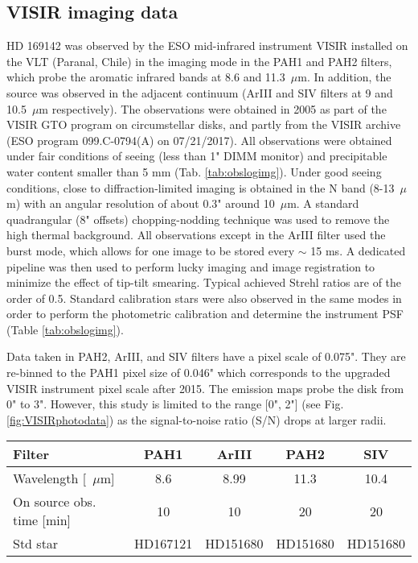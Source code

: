 \documentclass{aa}
\newcommand{\mic}{~$\mu$m\xspace}
\begin{document}
\subsection{VISIR imaging data} \label{sec:photometryVISIR} 
HD 169142 was observed by the ESO mid-infrared instrument VISIR installed on the VLT (Paranal, Chile) in the imaging mode in the PAH1 and PAH2 filters, which probe the aromatic infrared bands at 8.6 and 11.3\mic. In addition, the source was observed in the adjacent continuum (ArIII and SIV filters at 9 and 10.5\mic respectively).
The observations were obtained in 2005 as part of the VISIR GTO program on circumstellar disks, and partly from the VISIR archive (ESO program 099.C-0794(A) on 07/21/2017). All observations were obtained under fair conditions of seeing (less than 1" DIMM monitor) and precipitable water content smaller than 5 mm (Tab. \ref{tab:obslogimg}). Under good seeing conditions, close to diffraction-limited imaging is obtained in the N band (8-13\mic) with an angular resolution of about 0.3" around 10\mic. A standard quadrangular (8" offsets) chopping-nodding technique was used to remove the high thermal background.
All observations except in the ArIII filter used the burst mode, which allows for one image to be stored every $\sim$ 15 ms. A dedicated pipeline was then used to perform lucky imaging \citep{Law2006} and image registration to minimize the effect of tip-tilt smearing. Typical achieved Strehl ratios are of the order of 0.5. Standard calibration stars were also observed in the same modes in order to perform the photometric calibration and determine the instrument PSF (Table \ref{tab:obslogimg}).

Data taken in PAH2, ArIII, and SIV filters have a pixel scale of 0.075". They are re-binned to the PAH1 pixel size of 0.046" which corresponds to the upgraded VISIR instrument pixel scale after 2015. The emission maps probe the disk from 0" to 3". However, this study is limited to the range [0", 2"] (see Fig. \ref{fig:VISIRphotodata}) as the signal-to-noise ratio (S/N) drops at larger radii.

 \begin{table*}[!ht]
     \centering
     \begin{tabular}{lcccc}
          \hline
          Filter & PAH1 & ArIII & PAH2 & SIV \\
          \hline
          Wavelength [\mic]         & 8.6      & 8.99     & 11.3    & 10.4 \\
          On source obs. time [min] & 10       & 10       & 20       & 20 \\
          Std star                  & HD167121 & HD151680 & HD151680 & HD151680 \\
         \hline
     \end{tabular}
     \caption{Characteristics of the VISIR imaging observations.}
     \label{tab:obslogimg}
 \end{table*}
\end{document}
